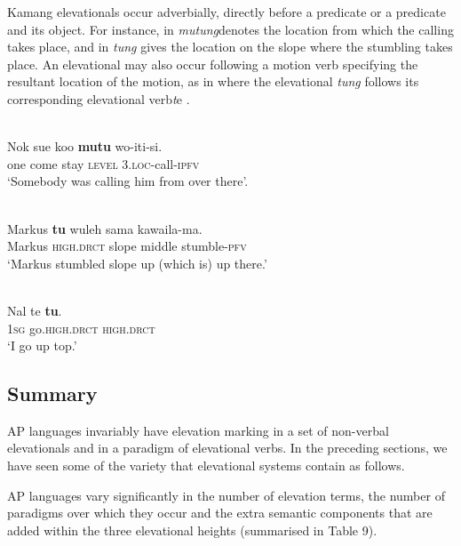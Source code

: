 \documentclass[output=paper]{LSP/langsci}
\begin{document}
Kamang elevationals occur adverbially, directly before a predicate or a predicate and its object. For instance, in  \textit{mutung}\textbf{\textit{}}denotes the location from which the calling takes place, and in  \textit{tung} gives the location on the slope where the stumbling takes place. An elevational may also occur following a motion verb specifying the resultant location of the motion, as in  where the elevational \textit{tung} follows its corresponding elevational verb\textit te .



\ea%
\label{ex:7:38}
 \\
\gll   Nok   sue  koo \textbf{mutu{\ng}}    wo-iti-si.\\
  one  come  stay  \textsc{level} \textsc {3.loc}{}-call-\textsc{ipfv}  \\
\glt  `Somebody was calling him from over there'.
\z



\ea%
\label{ex:7:39}
 \\
\gll Markus  \textbf{tu{\ng}} wuleh  sama  kawaila-ma.\\
 Markus  \textsc{high.drct} slope  middle  stumble-\textsc{pfv}  \\
\glt `Markus stumbled slope up (which is) up there.'
\z

  

  

  

 

\ea%
\label{ex:7:40}
 \\
\gll Nal   te  \textbf{tu{\ng}}.\\
 \textsc{1sg} go.\textsc{high.drct} \textsc {high.drct}   \\
\glt  `I go up top.'
\z

  

 

 

\subsection{Summary}
AP languages invariably have elevation marking in a set of non-verbal elevationals and in a paradigm of elevational verbs. In the preceding sections, we have seen some of the variety that elevational systems contain as follows. 

AP languages vary significantly in the number of elevation terms, the number of paradigms over which they occur and the extra semantic components that are added within the three elevational heights (summarised in Table 9). 
\end{document}

